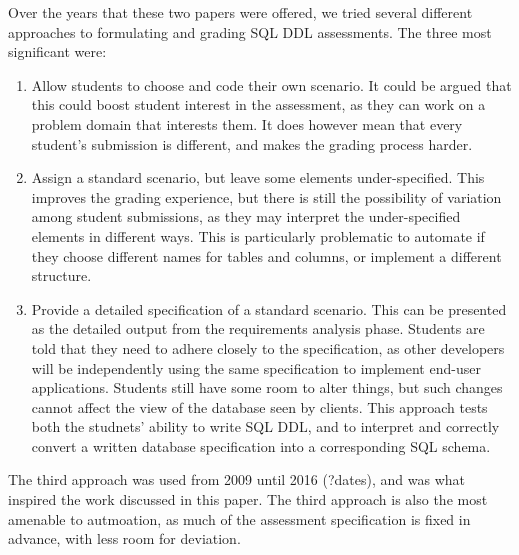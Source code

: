 \documentclass[sigconf, authordraft]{acmart}
\begin{document}
Over the years that these two papers were offered, we tried several different approaches to formulating and grading SQL DDL assessments. The three most significant were:
\begin{enumerate}
    \item Allow students to choose and code their own scenario. It could be argued that this could boost student interest in the assessment, as they can work on a problem domain that interests them. It does however mean that every student's submission is different, and makes the grading process harder.
    
    \item Assign a standard scenario, but leave some elements under-specified. This improves the grading experience, but there is still the possibility of variation among student submissions, as they may interpret the under-specified elements in different ways. This is particularly problematic to automate if they choose different names for tables and columns, or implement a different structure.
    
    \item Provide a detailed specification of a standard scenario. This can be presented as the detailed output from the requirements analysis phase. Students are told that they need to adhere closely to the specification, as other developers will be independently using the same specification to implement end-user applications. Students still have some room to alter things, but such changes cannot affect the view of the database seen by clients. This approach tests both the studnets' ability to write SQL DDL, and to interpret and correctly convert a written database specification into a corresponding SQL schema.
\end{enumerate}

The third approach was used from 2009 until 2016 (?dates), and was what inspired the work discussed in this paper. The third approach is also the most amenable to autmoation, as much of the assessment specification is fixed in advance, with less room for deviation.

\end{document}
